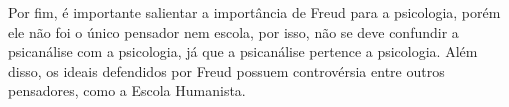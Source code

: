Por fim, é importante salientar a importância de Freud para a psicologia, porém ele não foi o único pensador nem escola, por isso, não se deve confundir a psicanálise com a psicologia, já que a psicanálise pertence a psicologia.
Além disso, os ideais defendidos por Freud possuem controvérsia entre outros pensadores, como a Escola Humanista.
